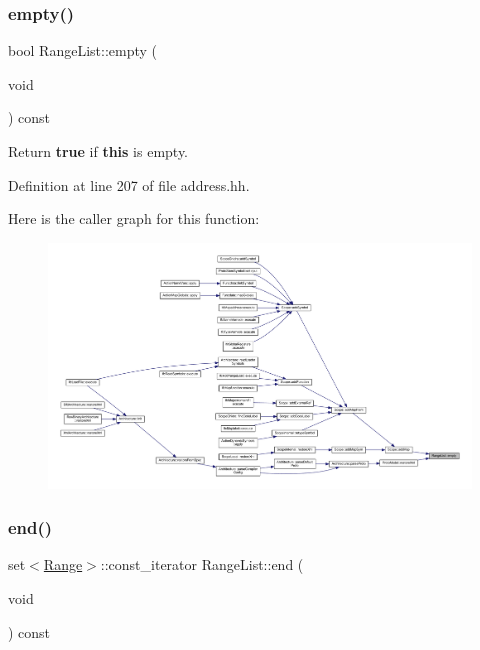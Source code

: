 \subsubsection{\texorpdfstring{empty()}{empty()}}
{\footnotesize\ttfamily bool Range\+List\+::empty (\begin{DoxyParamCaption}\item[{void}]{ }\end{DoxyParamCaption}) const\hspace{0.3cm}{\ttfamily [inline]}}



Return {\bfseries{true}} if {\bfseries{this}} is empty. 



Definition at line 207 of file address.\+hh.

Here is the caller graph for this function\+:
\nopagebreak
\begin{figure}[H]
\begin{center}
\leavevmode
\includegraphics[width=350pt]{class_range_list_ad78a4eba9787c374803f2503fdd38f3c_icgraph}
\end{center}
\end{figure}
\mbox{\label{class_range_list_aae742ac5298a0d263210366e7aa0bb0b}} 
\subsubsection{\texorpdfstring{end()}{end()}}
{\footnotesize\ttfamily set$<$\mbox{\hyperlink{class_range}{Range}}$>$\+::const\+\_\+iterator Range\+List\+::end (\begin{DoxyParamCaption}\item[{void}]{ }\end{DoxyParamCaption}) const\hspace{0.3cm}{\ttfamily [inline]}}



